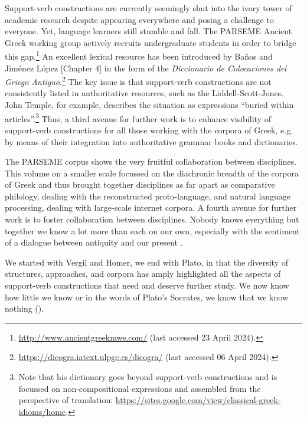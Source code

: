 \documentclass[output=paper,colorlinks,citecolor=brown]{langscibook}
\begin{document}
Support-verb constructions are currently seemingly shut into the ivory tower of academic research despite appearing everywhere and posing a challenge to everyone. Yet, language learners still stumble and fall. The PARSEME Ancient Greek working group actively recruits undergraduate students in order to bridge this gap.\footnote{\url{http://www.ancientgreekmwe.com/} (last accessed 23 April 2024).}  An excellent lexical resource has been introduced by Baños and Jiménez López [Chapter 4] in the form of the \textit{Diccionario de Colocaciones del Griego Antiguo}.\footnote{\url{https://dicogra.iatext.ulpgc.es/dicogra/} (last accessed 06 April 2024).} The key issue is that support-verb constructions are not consistently listed in authoritative resources, such as the Liddell-Scott-Jones. John Temple, for example, describes the situation as expressions “buried within articles”.\footnote{Note that his dictionary goes beyond support-verb constructions and is focussed on non-compositional expressions and assembled from the perspective of translation: \url{https://sites.google.com/view/classical-greek-idioms/home}.} Thus, a third avenue for further work is to enhance visibility of support-verb constructions for all those working with the corpora of Greek, e.g. by means of their integration into authoritative grammar books and dictionaries.


The PARSEME corpus shows the very fruitful collaboration between disciplines. This volume on a smaller scale focussed on the diachronic breadth of the corpora of Greek and thus brought together disciplines as far apart as comparative philology, dealing with the reconstructed proto-language, and natural language processing, dealing with large-scale internet corpora. A fourth avenue for further work is to foster collaboration between disciplines. Nobody knows everything but together we know a lot more than each on our own, especially with the sentiment of a dialogue between antiquity and our present \citep{vereeckWhyPlatoNeeds2023}. 


We started with Vergil and Homer, we end with Plato, in that the diversity of structures, approaches, and corpora has amply highlighted all the aspects of support-verb constructions that need and deserve further study. We now know how little we know or in the words of Plato’s Socrates, we know that we know nothing (). 


\end{document}
